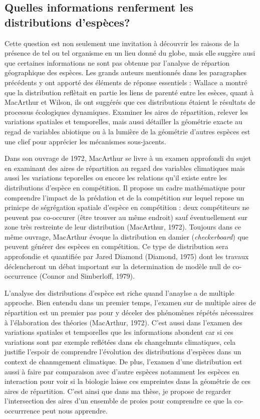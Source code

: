 \subsection*{Quelles informations renferment les distributions
d'espèces?}\label{quelles-informations-renferment-les-distributions-despuxe8ces}

Cette question est non seulement une invitation à découvrir les raisons
de la présence de tel ou tel organisme en un lieu donné du globe, mais
elle suggère ausi que certaines informations ne sont pas obtenue par
l'analyse de répartion géographique des espèces. Les grands auteurs
mentionnés dans les paragraphes précédents y ont apporté des éléments de
réponse essentiels : Wallace a montré que la distribution reflètait en
partie les liens de parenté entre les esèces, quant à MacArthur et
Wilson, ils ont suggérés que ces distributions étaient le résultats de
processus écologiques dynamiques. Examiner les aires de répartition,
relever les variations spatiales et temporelles, mais aussi détailler la
géométrie exacte au regad de variables abiotique ou à la lumière de la
géométrie d'autres espèces est une clief pour apprécier les mécanismes
sous-jacents.

Dans son ouvrage de 1972, MacArthur se livre à un examen approfondi du
sujet en examinant des aires de répartition au regard des variables
climatiques mais aussi les variations teporelles ou encore les relations
qu'il existe entre les distributions d'espèce en compétition. Il propose
un cadre mathématique pour comprendre l'impact de la prédation et de la
compétition sur lequel repose un prinicpe de ségrégation spatiale
d'espèce en compétition : deux compétiteurs ne peuvent pas co-occurer
(être trouver au même endroit) sauf éventuellement sur zone très
restreinte de leur distribution (MacArthur, 1972). Toujours dans ce même
ouvrage, MacArthur évoque la distribution en damier
(\emph{checkerboard}) que peuvent générer des espèces en compétition. Ce
type de distribution sera approfondie et quantifiée par Jared Diamond
(Diamond, 1975) dont les travaux déclencheront un débat important sur la
determination de modèle null de co-occurrence (Connor and Simberloff,
1979).

L'analyse des distributions d'espèce est riche quand l'anaylse a de
multiple approche. Bien entendu dans un premier temps, l'examen sur de
multiple aires de répartition est un premier pas pour y déceler des
phénomènes répétés nécessaires à l'élaboration des théories (MacArthur,
1972). C'est aussi dans l'examen des variations spatiales et temporelles
que les informations abondent car si ces variations sont par exemple
reflétées dans els changelmnts climatiques, cela justifie l'espoir de
comprendre l'évolution des distributions d'espèces dans un context de
chanmgement climatique. De plus, l'examen d'une distribution est aussi à
faire par comparaison avec d'autre espèces notamment les espèces en
interaction pour voir si la biologie laisse ces empreintes dans la
géométrie de ces aires de répartition. C'est ainsi que dans ma thèse, je
propose de regarder l'intersection des aires d'un ensemble de proies
pour comprendre ce que la co-occurrrence peut nous apprendre.

